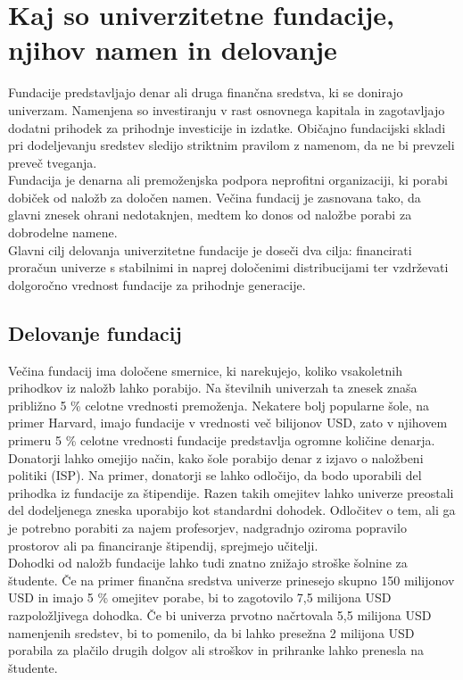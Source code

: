 \documentclass[12pt, a4paper]{article}
\begin{document}
\section{Kaj so univerzitetne fundacije, njihov namen in delovanje}


Fundacije predstavljajo denar ali druga finančna sredstva, ki se donirajo univerzam. Namenjena so investiranju v rast osnovnega kapitala in zagotavljajo dodatni prihodek za prihodnje investicije in izdatke. Običajno fundacijski skladi pri dodeljevanju sredstev sledijo striktnim pravilom z namenom, da ne bi prevzeli preveč tveganja. \\

Fundacija je denarna ali premoženjska podpora neprofitni organizaciji, ki porabi dobiček od naložb za določen namen. Večina fundacij je zasnovana tako, da glavni znesek ohrani nedotaknjen, medtem ko donos od naložbe porabi za dobrodelne namene. \\

Glavni cilj delovanja univerzitetne fundacije je doseči dva cilja: financirati proračun univerze s stabilnimi in naprej določenimi distribucijami ter vzdrževati dolgoročno vrednost fundacije za prihodnje generacije. \cite{harvard-porocilo}

\subsection{Delovanje fundacij}

Večina fundacij ima določene smernice, ki narekujejo, koliko vsakoletnih prihodkov iz naložb lahko porabijo. Na številnih univerzah ta znesek znaša približno 5 \% celotne vrednosti premoženja. Nekatere bolj popularne šole, na primer Harvard, imajo fundacije v vrednosti več bilijonov USD, zato v njihovem primeru 5 \% celotne vrednosti fundacije predstavlja ogromne količine denarja. \cite{Investopedia}\\

Donatorji lahko omejijo način, kako šole porabijo denar z izjavo o naložbeni politiki (ISP). Na primer, donatorji se lahko odločijo, da bodo uporabili del prihodka iz fundacije za štipendije. Razen takih omejitev lahko univerze preostali del dodeljenega zneska uporabijo kot standardni dohodek. Odločitev o tem, ali ga je potrebno porabiti za najem profesorjev, nadgradnjo oziroma popravilo prostorov ali pa financiranje štipendij, sprejmejo učitelji. \\

Dohodki od naložb fundacije lahko tudi znatno znižajo stroške šolnine za študente. Če na primer finančna sredstva univerze prinesejo skupno 150 milijonov USD in imajo 5 \% omejitev porabe, bi to zagotovilo 7,5 milijona USD razpoložljivega dohodka. Če bi univerza prvotno načrtovala 5,5 milijona USD namenjenih sredstev, bi to pomenilo, da bi lahko presežna 2 milijona USD porabila za plačilo drugih dolgov ali stroškov in prihranke lahko prenesla na študente. \cite{Investopedia}\\
\end{document}
